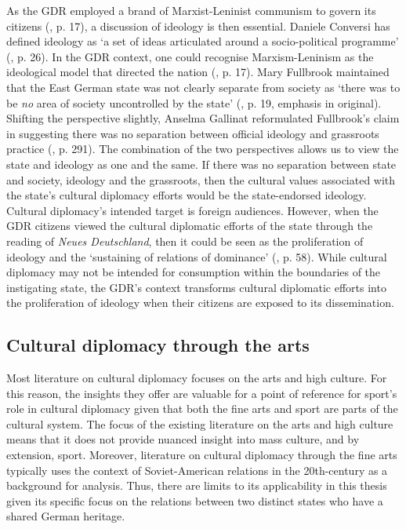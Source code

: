 As the GDR employed a brand of Marxist-Leninist communism to govern its citizens (\cite{grixcooke2002}, p. 17), a discussion of ideology is then essential. Daniele Conversi has defined ideology as ‘a set of ideas articulated around a socio-political programme’ (\citeyear{conversi2010}, p. 26). In the GDR context, one could recognise Marxism-Leninism as the ideological model that directed the nation (\cite{grixcooke2002}, p. 17). Mary Fullbrook maintained that the East German state was not clearly separate from society as ‘there was to be \textit{no} area of society uncontrolled by the state’ (\citeyear{fullbrook1995}, p. 19, emphasis in original). Shifting the perspective slightly, Anselma Gallinat reformulated Fullbrook’s claim in suggesting there was no separation between official ideology and grassroots practice (\citeyear{gallinat2005}, p. 291). The combination of the two perspectives allows us to view the state and ideology as one and the same. If there was no separation between state and society, ideology and the grassroots, then the cultural values associated with the state’s cultural diplomacy efforts would be the state-endorsed ideology. Cultural diplomacy’s intended target is foreign audiences. However, when the GDR citizens viewed the cultural diplomatic efforts of the state through the reading of \textit{Neues Deutschland}, then it could be seen as the proliferation of ideology and the ‘sustaining of relations of dominance’ (\cite{thompson1990}, p. 58). While cultural diplomacy may not be intended for consumption within the boundaries of the instigating state, the GDR’s context transforms cultural diplomatic efforts into the proliferation of ideology when their citizens are exposed to its dissemination.

\subsection*{Cultural diplomacy through the arts}

Most literature on cultural diplomacy focuses on the arts and high culture. For this reason, the insights they offer are valuable for a point of reference for sport’s role in cultural diplomacy given that both the fine arts and sport are parts of the cultural system. The focus of the existing literature on the arts and high culture means that it does not provide nuanced insight into mass culture, and by extension, sport. Moreover, literature on cultural diplomacy through the fine arts typically uses the context of Soviet-American relations in the 20th-century as a background for analysis. Thus, there are limits to its applicability in this thesis given its specific focus on the relations between two distinct states who have a shared German heritage.


